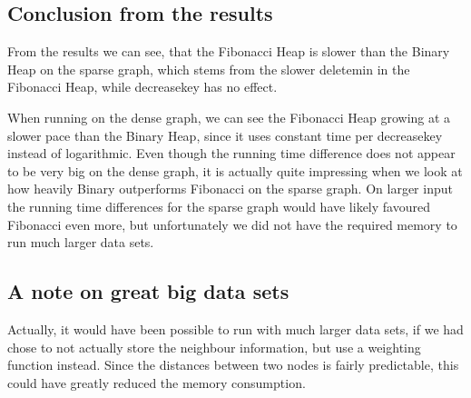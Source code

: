 \subsection{Conclusion from the results}

From the results we can see, that the Fibonacci Heap is slower than the Binary Heap on the sparse graph, which stems from the slower deletemin in the Fibonacci Heap, while decreasekey has no effect.

When running on the dense graph, we can see the Fibonacci Heap growing at a slower pace than the Binary Heap, since it uses constant time per decreasekey instead of logarithmic.
Even though the running time difference does not appear to be very big on the dense graph, it is actually quite impressing when we look at how heavily Binary outperforms Fibonacci on the sparse graph. On larger input the running time differences for the sparse graph would have likely favoured Fibonacci even more, but unfortunately we did not have the required memory to run much larger data sets.

\subsection{A note on great big data sets}

Actually, it would have been possible to run with much larger data sets, if we had chose to not actually store the neighbour information, but use a weighting function instead. Since the distances between two nodes is fairly predictable, this could have greatly reduced the memory consumption. 